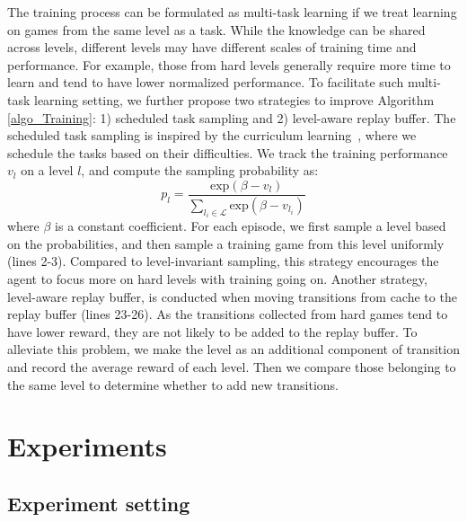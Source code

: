 \documentclass[11pt]{article}
\begin{document}
The training process can be formulated as multi-task learning if we treat learning on games from the same level as a task. 
While the knowledge can be shared across levels, different levels may have different scales of training time and performance.
For example, those from hard levels generally require more time to learn and tend to have lower normalized performance. 
To facilitate such multi-task learning setting, we further propose two strategies to improve Algorithm \ref{algo_Training}: 1) scheduled task sampling and 2) level-aware replay buffer. 
The scheduled task sampling is  inspired by the curriculum learning~\cite{bengio2009curriculum}, where we schedule the tasks based on their difficulties. 
We track the training performance $v_l$ on a level $l$, and compute the sampling probability as: 
\begin{equation}
    p_{l} = \frac{\text{exp}(\beta - v_{l})}{\sum_{l_i \in \mathcal{L}} \text{exp}(\beta - v_{l_i})}
\label{eq_pl}
\end{equation}
where $\beta$ is a constant coefficient. 
For each episode, we first sample a level based on the probabilities, and then sample a training game from this level uniformly (lines 2-3). 
Compared to level-invariant sampling, this strategy encourages the agent to focus more on hard levels with training going on. 
Another strategy, level-aware replay buffer, is conducted when moving transitions from cache to the replay buffer (lines 23-26). 
As the transitions collected from hard games tend to have lower reward, they are not likely to be added to the replay buffer. 
To alleviate this problem, we make the level as an additional component of transition and record the average reward of each level.
Then we compare those belonging to the same level to determine whether to add new transitions. 

\section{Experiments}
\subsection{Experiment setting}
\end{document}
